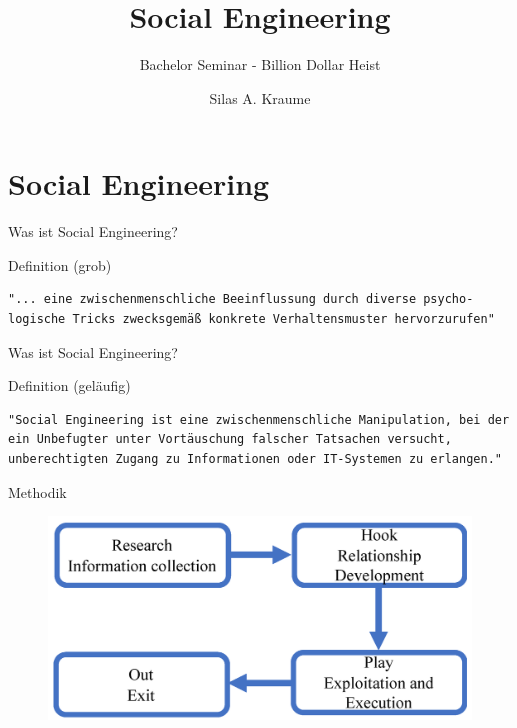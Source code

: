 \documentclass{beamer}
\title{Social Engineering}
\subtitle{Bachelor Seminar - Billion Dollar Heist}
\author{Silas A. Kraume}
\date{}
\begin{document}
\maketitle

\section{Social Engineering}

\begin{frame}[fragile]{Was ist Social Engineering?}
    \begin{block}{Definition (grob)}
        \begin{verbatim}
"... eine zwischenmenschliche Beeinflussung durch diverse psycho-
logische Tricks zwecksgemäß konkrete Verhaltensmuster hervorzurufen"
        \end{verbatim}
    \end{block}
\end{frame}

\begin{frame}[fragile]{Was ist Social Engineering?}
    \begin{block}{Definition (geläufig)}
        \begin{verbatim}
"Social Engineering ist eine zwischenmenschliche Manipulation, bei der 
ein Unbefugter unter Vortäuschung falscher Tatsachen versucht,
unberechtigten Zugang zu Informationen oder IT-Systemen zu erlangen."
        \end{verbatim}
    \end{block}
    \begin{center}
    \end{center}
    \nocite{bka}
\end{frame}

\begin{frame}{Methodik}
    \begin{figure}[!htp]
        \centering
        \includegraphics[scale=.15]{Methodik}
    \end{figure}
    \begin{center}
    \end{center}
    \nocite{methodik}
\end{frame}
\end{document}
